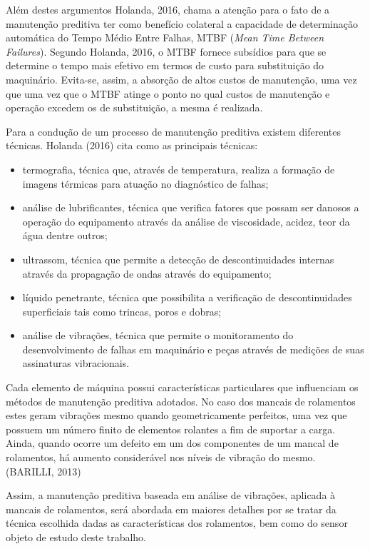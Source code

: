 \documentclass[
	12pt,				
	oneside,			
	a4paper,			
	english,			
	brazil,			
	]{abntex2ppgsi}
\begin{document}
Além destes argumentos Holanda, 2016, chama a atenção para o fato de a manutenção preditiva ter como benefício colateral a capacidade de determinação automática do Tempo Médio Entre Falhas, MTBF (\textit{Mean Time Between Failures}). Segundo Holanda, 2016, o MTBF fornece subsídios para que se determine o tempo mais efetivo em termos de custo para substituição do maquinário. Evita-se, assim, a absorção de altos custos de manutenção, uma vez que uma vez que o MTBF atinge o ponto no qual custos de manutenção e operação excedem os de substituição, a mesma é realizada. 

Para a condução de um processo de manutenção preditiva existem diferentes técnicas. Holanda (2016) cita como as principais técnicas: 
\begin{itemize}
	\item termografia, técnica que, através de temperatura, realiza a formação de imagens térmicas para atuação no diagnóstico de falhas; 
	\item análise de lubrificantes, técnica que verifica fatores que possam ser danosos a operação do equipamento através da análise de viscosidade, acidez, teor da água dentre outros; 
	\item ultrassom, técnica que permite a detecção de descontinuidades internas através da propagação de ondas através do equipamento; 
	\item líquido penetrante, técnica que possibilita a verificação de descontinuidades superficiais tais como trincas, poros e dobras; 
	\item análise de vibrações, técnica que permite o monitoramento do desenvolvimento de falhas em maquinário e peças através de medições de suas assinaturas vibracionais. 
\end{itemize}

Cada elemento de máquina possui características particulares que influenciam os métodos de manutenção preditiva adotados. No caso dos mancais de rolamentos estes geram vibrações mesmo quando geometricamente perfeitos, uma vez que possuem um número finito de elementos rolantes a fim de suportar a carga. Ainda, quando ocorre um defeito em um dos componentes de um mancal de rolamentos, há aumento considerável nos níveis de vibração do mesmo. (BARILLI, 2013)

Assim, a manutenção preditiva baseada em análise de vibrações, aplicada à mancais de rolamentos, será abordada em maiores detalhes por se tratar da técnica escolhida dadas as características dos rolamentos, bem como do sensor objeto de estudo deste trabalho.
\end{document}

